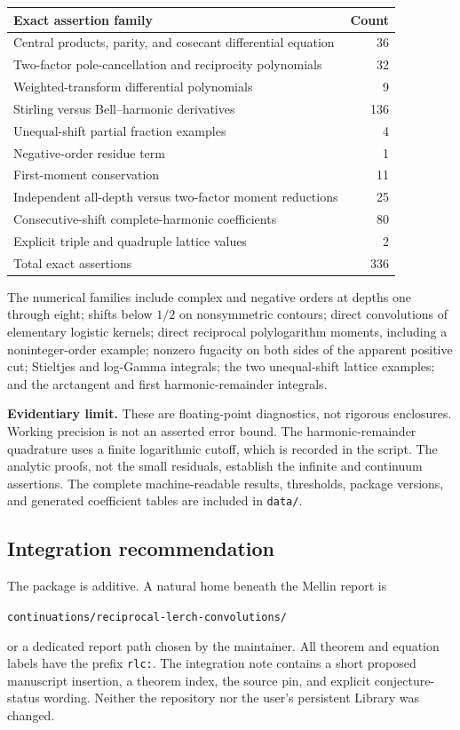 \documentclass[11pt,a4paper]{article}
\numberwithin{equation}{section}
\theoremstyle{definition}\newtheorem{definition}[theorem]{Definition}
\theoremstyle{remark}\newtheorem{remark}[theorem]{Remark}
\newcommand{\src}[1]{\nolinkurl{#1}}
\begin{document}
\begin{center}
\begin{tabular}{@{}lr@{}}
\toprule
Exact assertion family & Count\\
\midrule
Central products, parity, and cosecant differential equation &36\\
Two-factor pole-cancellation and reciprocity polynomials &32\\
Weighted-transform differential polynomials &9\\
Stirling versus Bell--harmonic derivatives &136\\
Unequal-shift partial fraction examples &4\\
Negative-order residue term &1\\
First-moment conservation &11\\
Independent all-depth versus two-factor moment reductions &25\\
Consecutive-shift complete-harmonic coefficients &80\\
Explicit triple and quadruple lattice values &2\\
\midrule
Total exact assertions &336\\
\bottomrule
\end{tabular}
\end{center}

The numerical families include complex and negative orders at depths
one through eight; shifts below $1/2$ on nonsymmetric contours;
direct convolutions of elementary logistic kernels; direct reciprocal
polylogarithm moments, including a noninteger-order example; nonzero
fugacity on both sides of the apparent positive cut; Stieltjes and
log-Gamma integrals; the two unequal-shift lattice examples; and the
arctangent and first harmonic-remainder integrals.

\textbf{Evidentiary limit.} These are floating-point diagnostics, not
rigorous enclosures. Working precision is not an asserted error bound.
The harmonic-remainder quadrature uses a finite logarithmic cutoff,
which is recorded in the script. The analytic proofs, not the small
residuals, establish the infinite and continuum assertions. The complete
machine-readable results, thresholds, package versions, and generated
coefficient tables are included in \src{data/}.

\subsection{Integration recommendation}
The package is additive. A natural home beneath the Mellin report is
\begin{center}\small
\src{continuations/reciprocal-lerch-convolutions/}
\end{center}
or a dedicated report path chosen by the maintainer.
All theorem and equation labels have the prefix \src{rlc:}.
The integration note contains a short proposed manuscript insertion,
a theorem index, the source pin, and explicit conjecture-status wording.
Neither the repository nor the user's persistent Library was changed.
\end{document}
